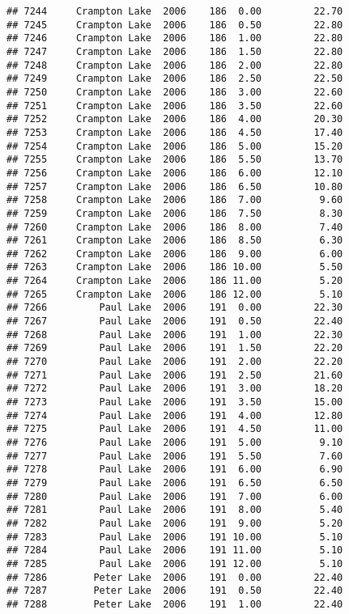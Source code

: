 \documentclass[
]{article}
\begin{document}
\begin{verbatim}
## 7244     Crampton Lake  2006    186  0.00         22.70
## 7245     Crampton Lake  2006    186  0.50         22.80
## 7246     Crampton Lake  2006    186  1.00         22.80
## 7247     Crampton Lake  2006    186  1.50         22.80
## 7248     Crampton Lake  2006    186  2.00         22.80
## 7249     Crampton Lake  2006    186  2.50         22.50
## 7250     Crampton Lake  2006    186  3.00         22.60
## 7251     Crampton Lake  2006    186  3.50         22.60
## 7252     Crampton Lake  2006    186  4.00         20.30
## 7253     Crampton Lake  2006    186  4.50         17.40
## 7254     Crampton Lake  2006    186  5.00         15.20
## 7255     Crampton Lake  2006    186  5.50         13.70
## 7256     Crampton Lake  2006    186  6.00         12.10
## 7257     Crampton Lake  2006    186  6.50         10.80
## 7258     Crampton Lake  2006    186  7.00          9.60
## 7259     Crampton Lake  2006    186  7.50          8.30
## 7260     Crampton Lake  2006    186  8.00          7.40
## 7261     Crampton Lake  2006    186  8.50          6.30
## 7262     Crampton Lake  2006    186  9.00          6.00
## 7263     Crampton Lake  2006    186 10.00          5.50
## 7264     Crampton Lake  2006    186 11.00          5.20
## 7265     Crampton Lake  2006    186 12.00          5.10
## 7266         Paul Lake  2006    191  0.00         22.30
## 7267         Paul Lake  2006    191  0.50         22.40
## 7268         Paul Lake  2006    191  1.00         22.30
## 7269         Paul Lake  2006    191  1.50         22.20
## 7270         Paul Lake  2006    191  2.00         22.20
## 7271         Paul Lake  2006    191  2.50         21.60
## 7272         Paul Lake  2006    191  3.00         18.20
## 7273         Paul Lake  2006    191  3.50         15.00
## 7274         Paul Lake  2006    191  4.00         12.80
## 7275         Paul Lake  2006    191  4.50         11.00
## 7276         Paul Lake  2006    191  5.00          9.10
## 7277         Paul Lake  2006    191  5.50          7.60
## 7278         Paul Lake  2006    191  6.00          6.90
## 7279         Paul Lake  2006    191  6.50          6.50
## 7280         Paul Lake  2006    191  7.00          6.00
## 7281         Paul Lake  2006    191  8.00          5.40
## 7282         Paul Lake  2006    191  9.00          5.20
## 7283         Paul Lake  2006    191 10.00          5.10
## 7284         Paul Lake  2006    191 11.00          5.10
## 7285         Paul Lake  2006    191 12.00          5.10
## 7286        Peter Lake  2006    191  0.00         22.40
## 7287        Peter Lake  2006    191  0.50         22.40
## 7288        Peter Lake  2006    191  1.00         22.40

\end{verbatim}
\end{document}
